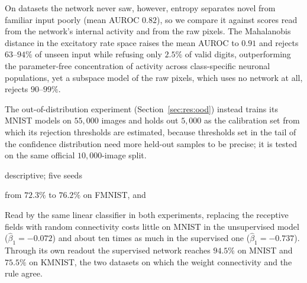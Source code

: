 
On datasets the network never saw, however, entropy separates novel from familiar input
poorly (mean AUROC $0.82$), so we compare it against scores read from the network's
internal activity and from the raw pixels. The Mahalanobis distance in the excitatory
rate space raises the mean AUROC to $0.91$ and rejects $63$--$94\%$ of unseen input while
refusing only $2.5\%$ of valid digits, outperforming the parameter-free concentration of
activity across class-specific neuronal populations, yet a subspace model of the raw pixels,
which uses no network at all, rejects $90$--$99\%$.

The out-of-distribution experiment (Section~\ref{sec:res:ood}) instead trains its MNIST models
on $55{,}000$ images and holds out $5{,}000$ as the calibration set from which its rejection
thresholds are estimated, because thresholds set in the tail of the confidence distribution
need more held-out samples to be precise; it is tested on the same official $10{,}000$-image
split.

descriptive; five seeds

from $72.3\%$ to $76.2\%$ on FMNIST, and

Read by the same linear classifier in both experiments, replacing the receptive fields with
random connectivity costs little on MNIST in the unsupervised model ($\hat{\beta}_1 = -0.072$)
and about ten times as much in the supervised one ($\hat{\beta}_1 = -0.737$). Through its own
readout the supervised network reaches $94.5\%$ on MNIST and $75.5\%$ on KMNIST, the two
datasets on which the weight connectivity and the rule agree.

